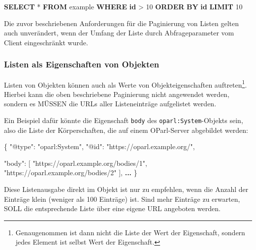 \documentclass[,a4paper]{article}
\newenvironment{Shaded}{}{}
\newcommand{\KeywordTok}[1]{\textcolor[rgb]{0.00,0.44,0.13}{\textbf{{#1}}}}
\newcommand{\DataTypeTok}[1]{\textcolor[rgb]{0.56,0.13,0.00}{{#1}}}
\newcommand{\DecValTok}[1]{\textcolor[rgb]{0.25,0.63,0.44}{{#1}}}
\newcommand{\StringTok}[1]{\textcolor[rgb]{0.25,0.44,0.63}{{#1}}}
\newcommand{\OtherTok}[1]{\textcolor[rgb]{0.00,0.44,0.13}{{#1}}}
\newcommand{\FunctionTok}[1]{\textcolor[rgb]{0.02,0.16,0.49}{{#1}}}
\newcommand{\ErrorTok}[1]{\textcolor[rgb]{1.00,0.00,0.00}{\textbf{{#1}}}}
\newcommand{\NormalTok}[1]{{#1}}
\begin{document}
\begin{Shaded}
\begin{Highlighting}[]
\KeywordTok{SELECT} \NormalTok{* }\KeywordTok{FROM} \NormalTok{example }\KeywordTok{WHERE} \KeywordTok{id} \NormalTok{> }\DecValTok{10} \KeywordTok{ORDER} \KeywordTok{BY} \KeywordTok{id} \KeywordTok{LIMIT} \DecValTok{10}
\end{Highlighting}
\end{Shaded}

Die zuvor beschriebenen Anforderungen für die Paginierung von Listen
gelten auch unverändert, wenn der Umfang der Liste durch
Abfrageparameter vom Client eingeschränkt wurde.

\subsubsection{Listen als Eigenschaften von
Objekten}\label{listen-als-eigenschaften-von-objekten}

Listen von Objekten können auch als Werte von Objekteigenschaften
auftreten\footnote{Genaugenommen ist dann nicht die Liste der Wert der
  Eigenschaft, sondern jedes Element ist selbst Wert der Eigenschaft.}.
Hierbei kann die oben beschriebene Paginierung nicht angewendet werden,
sondern es MÜSSEN die URLs aller Listeneinträge aufgelistet werden.

Ein Beispiel dafür könnte die Eigenschaft \texttt{body} des
\texttt{oparl:System}-Objekts sein, also die Liste der Körperschaften,
die auf einem OParl-Server abgebildet werden:

\begin{Shaded}
\begin{Highlighting}[]
\FunctionTok{\{}
    \DataTypeTok{"@type"}\FunctionTok{:} \StringTok{"oparl:System"}\FunctionTok{,}
    \DataTypeTok{"@id"}\FunctionTok{:} \StringTok{"https://oparl.example.org/"}\FunctionTok{,}

    \DataTypeTok{"body"}\FunctionTok{:} \OtherTok{[}
        \StringTok{"https://oparl.example.org/bodies/1"}\OtherTok{,}
        \StringTok{"https://oparl.example.org/bodies/2"}
    \OtherTok{]}\FunctionTok{,}
    \ErrorTok{...}
\FunctionTok{\}}
\end{Highlighting}
\end{Shaded}

Diese Listenausgabe direkt im Objekt ist nur zu empfehlen, wenn die
Anzahl der Einträge klein (weniger als 100 Einträge) ist. Sind mehr
Einträge zu erwarten, SOLL die entsprechende Liste über eine eigene URL
angeboten werden.
\end{document}
